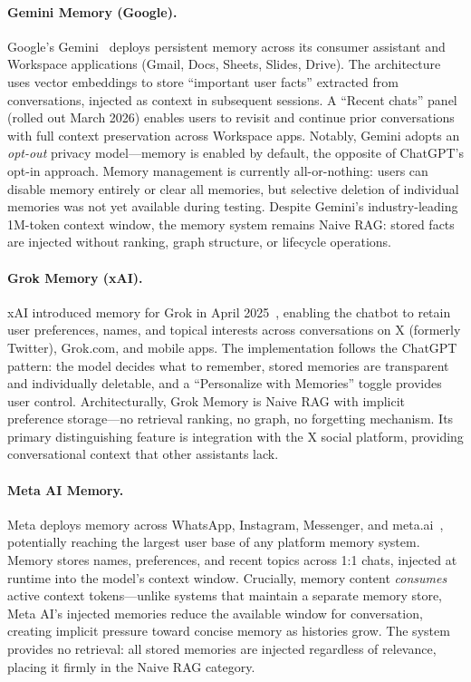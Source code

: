 \paragraph{Gemini Memory (Google).}
Google's Gemini~\cite{gemini2026memory} deploys persistent memory across
its consumer assistant and Workspace applications (Gmail, Docs, Sheets,
Slides, Drive).  The architecture uses vector embeddings to store
``important user facts'' extracted from conversations, injected as
context in subsequent sessions.  A ``Recent chats'' panel (rolled out
March 2026) enables users to revisit and continue prior conversations
with full context preservation across Workspace apps.  Notably, Gemini
adopts an \emph{opt-out} privacy model---memory is enabled by default,
the opposite of ChatGPT's opt-in approach.  Memory management is
currently all-or-nothing: users can disable memory entirely or clear
all memories, but selective deletion of individual memories was not
yet available during testing.  Despite Gemini's industry-leading 1M-token
context window, the memory system remains Naive RAG: stored facts are
injected without ranking, graph structure, or lifecycle operations.

\paragraph{Grok Memory (xAI).}
xAI introduced memory for Grok in April 2025~\cite{grok2025memory},
enabling the chatbot to retain user preferences, names, and topical
interests across conversations on X (formerly Twitter), Grok.com, and
mobile apps.  The implementation follows the ChatGPT pattern: the model
decides what to remember, stored memories are transparent and
individually deletable, and a ``Personalize with Memories'' toggle
provides user control.  Architecturally, Grok Memory is Naive RAG with
implicit preference storage---no retrieval ranking, no graph, no
forgetting mechanism.  Its primary distinguishing feature is integration
with the X social platform, providing conversational context that other
assistants lack.

\paragraph{Meta AI Memory.}
Meta deploys memory across WhatsApp, Instagram, Messenger, and
meta.ai~\cite{meta2025aimemory}, potentially reaching the largest user
base of any platform memory system.  Memory stores names, preferences,
and recent topics across 1:1 chats, injected at runtime into the
model's context window.  Crucially, memory content \emph{consumes}
active context tokens---unlike systems that maintain a separate memory
store, Meta AI's injected memories reduce the available window for
conversation, creating implicit pressure toward concise memory as
histories grow.  The system provides no retrieval: all stored memories
are injected regardless of relevance, placing it firmly in the Naive
RAG category.

